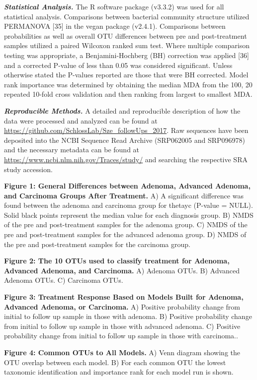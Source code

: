 \documentclass[12pt,]{article}
\begin{document}
\textbf{\emph{Statistical Analysis.}} The R software package (v3.3.2)
was used for all statistical analysis. Comparisons between bacterial
community structure utilized PERMANOVA {[}35{]} in the vegan package
(v2.4.1). Comparisons between probabilities as well as overall OTU
differences between pre and post-treatment samples utilized a paired
Wilcoxon ranked sum test. Where multiple comparison testing was
appropriate, a Benjamini-Hochberg (BH) correction was applied {[}36{]}
and a corrected P-value of less than 0.05 was considered significant.
Unless otherwise stated the P-values reported are those that were BH
corrected. Model rank importance was determined by obtaining the median
MDA from the 100, 20 repeated 10-fold cross validation and then ranking
from largest to smallest MDA.

\textbf{\emph{Reproducible Methods.}} A detailed and reproducible
description of how the data were processed and analyzed can be found at
\url{https://github.com/SchlossLab/Sze_followUps_2017}. Raw sequences
have been deposited into the NCBI Sequence Read Archive (SRP062005 and
SRP096978) and the necessary metadata can be found at
\url{https://www.ncbi.nlm.nih.gov/Traces/study/} and searching the
respective SRA study accession.

\newpage

\textbf{Figure 1: General Differences between Adenoma, Advanced Adenoma,
and Carcinoma Groups After Treatment.} A) A significant difference was
found between the adenoma and carcinoma group for thetayc (P-value =
NULL). Solid black points represent the median value for each diagnosis
group. B) NMDS of the pre and post-treatment samples for the adenoma
group. C) NMDS of the pre and post-treatment samples for the advanced
adenoma group. D) NMDS of the pre and post-treatment samples for the
carcinoma group.

\textbf{Figure 2: The 10 OTUs used to classify treatment for Adenoma,
Advanced Adenoma, and Carcinoma.} A) Adenoma OTUs. B) Advanced Adenoma
OTUs. C) Carcinoma OTUs.

\textbf{Figure 3: Treatment Response Based on Models Built for Adenoma,
Advanced Adenoma, or Carcinoma.} A) Positive probability change from
initial to follow up sample in those with adenoma. B) Positive
probability change from initial to follow up sample in those with
advanced adenoma. C) Positive probability change from initial to follow
up sample in those with carcinoma..

\textbf{Figure 4: Common OTUs to All Models.} A) Venn diagram showing
the OTU overlap between each model. B) For each common OTU the lowest
taxonomic identification and importance rank for each model run is
shown.
\end{document}
